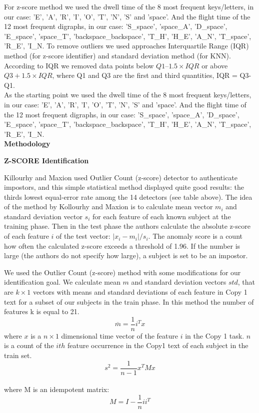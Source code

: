 \documentclass[12pt,a4]{article}
\begin{document}
For z-score method we used the dwell time of the 8 most frequent keys/letters, in our case:
'E', 'A', 'R', 'I', 'O', 'T', 'N', 'S' and 'space'. And the flight time of the 12 most frequent digraphs, in our case: 'S\_space', 'space\_A', 'D\_space', 'E\_space', 'space\_T', 'backspace\_backspace', 'T\_H', 'H\_E', 'A\_N', 'T\_space', 'R\_E', 'I\_N.
To remove outliers we used approaches Interquartile Range (IQR) method (for z-score identifier) and standard deviation method (for KNN). According to IQR we removed data points below $Q1 – 1.5 \times IQR$ or above $Q3 + 1.5 \times IQR$, where Q1 and Q3 are the first and third quantities, IQR = Q3-Q1. \\

As the starting point we used the dwell time of the 8 most frequent keys/letters, in our case:
'E', 'A', 'R', 'I', 'O', 'T', 'N', 'S' and 'space'. And the flight time of the 12 most frequent digraphs, in our case: 'S\_space', 'space\_A', 'D\_space', 'E\_space', 'space\_T', 'backspace\_backspace', 'T\_H', 'H\_E', 'A\_N', 'T\_space', 'R\_E', 'I\_N. \\


\bigskip
\large\textbf{Methodology }
\bigskip

\medskip
\small\textbf{Z-SCORE Identification}
\medskip

\normalsize

Killourhy and Maxion \cite{killourhy2009comparing} used Outlier Count (z-score) detector to authenticate impostors, and this simple statistical method displayed quite good results: the thirds lowest equal-error rate among the 14 detectors (see table above).  The idea of the method by Kollourhy and Maxion is to calculate mean vector $m_i$ and standard deviation vector $s_i$ for each feature of each known subject at the training phase. Then in the test phase the authors calculate the absolute z-score of each feature $i$ of the test vector: $|x_i-m_i|/s_i$. The anomaly score is a count how often the calculated z-score exceeds a threshold of 1.96. If the number is large (the authors do not specify how large), a subject is set to be an impostor.

We used the Outlier Count (z-score) method with some modifications for our identification goal. We calculate mean $m$ and standard deviation vectors $std$, that are $k \times 1$ vectors with means and standard deviations of each feature in Copy 1 text for a subset of our subjects in the train phase. In this method the number of features k is equal to 21.
$$
\overline{m} = \frac{1}{n}i^T x
$$
 where $x$ is a $n\times 1$ dimensional time vector of the feature $i$ in the Copy 1 task. $n$ is a count of the $ith$ feature occurrence in the Copy1 text of each subject in the train set. \\
$$
s^2 = \frac{1}{n-1} x^T M x
$$
\\
where M  is an idempotent matrix:
$$
M = I - \frac{1}{n}ii^T
$$
\end{document}
